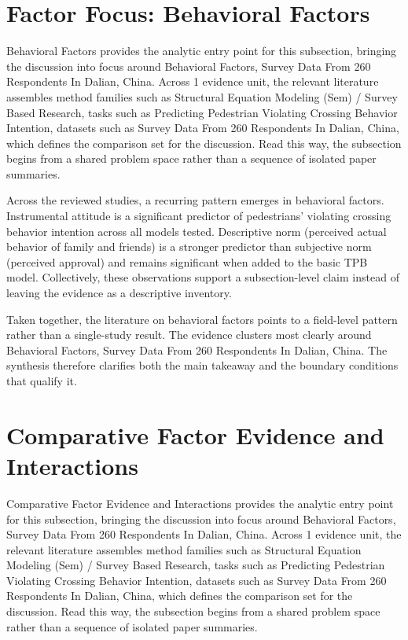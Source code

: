 \documentclass{article}
\begin{document}
\section{Factor Focus: Behavioral Factors}
Behavioral Factors provides the analytic entry point for this subsection, bringing the discussion into focus around Behavioral Factors, Survey Data From 260 Respondents In Dalian, China. Across 1 evidence unit, the relevant literature assembles method families such as Structural Equation Modeling (Sem) / Survey Based Research, tasks such as Predicting Pedestrian Violating Crossing Behavior Intention, datasets such as Survey Data From 260 Respondents In Dalian, China, which defines the comparison set for the discussion. Read this way, the subsection begins from a shared problem space rather than a sequence of isolated paper summaries. \cite{08_2016_zhou_aap}

Across the reviewed studies, a recurring pattern emerges in behavioral factors. Instrumental attitude is a significant predictor of pedestrians' violating crossing behavior intention across all models tested. Descriptive norm (perceived actual behavior of family and friends) is a stronger predictor than subjective norm (perceived approval) and remains significant when added to the basic TPB model. Collectively, these observations support a subsection-level claim instead of leaving the evidence as a descriptive inventory. \cite{08_2016_zhou_aap}

Taken together, the literature on behavioral factors points to a field-level pattern rather than a single-study result. The evidence clusters most clearly around Behavioral Factors, Survey Data From 260 Respondents In Dalian, China. The synthesis therefore clarifies both the main takeaway and the boundary conditions that qualify it. \cite{08_2016_zhou_aap}

\section{Comparative Factor Evidence and Interactions}
Comparative Factor Evidence and Interactions provides the analytic entry point for this subsection, bringing the discussion into focus around Behavioral Factors, Survey Data From 260 Respondents In Dalian, China. Across 1 evidence unit, the relevant literature assembles method families such as Structural Equation Modeling (Sem) / Survey Based Research, tasks such as Predicting Pedestrian Violating Crossing Behavior Intention, datasets such as Survey Data From 260 Respondents In Dalian, China, which defines the comparison set for the discussion. Read this way, the subsection begins from a shared problem space rather than a sequence of isolated paper summaries. \cite{08_2016_zhou_aap}
\end{document}
